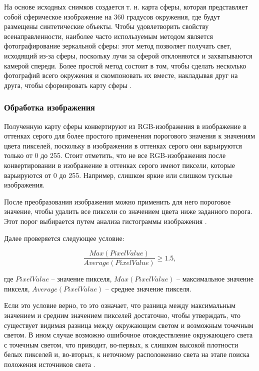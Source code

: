 На основе исходных снимков создается т. н. карта сферы, которая представляет собой сферическое изображение на 360 градусов окружения, где будут размещены синтетические объекты. Чтобы удовлетворить свойству всенаправленности, наиболее часто используемым методом является фотографирование зеркальной сферы: этот метод позволяет получать свет, исходящий из-за сферы, поскольку лучи за сферой отклоняются и захватываются камерой спереди. Более простой метод состоит в том, чтобы сделать несколько фотографий всего окружения и скомпоновать их вместе, накладывая друг на друга, чтобы сформировать карту сферы \cite{osti2019real}.

\subsubsection*{Обработка изображения}

Полученную карту сферы конвертируют из RGB-изображения в изображение в оттенках серого для более простого применения порогового значения к
значениям цвета пикселей, поскольку в изображении в оттенках серого они варьируются только от 0 до 255. Стоит отметить, что не все RGB-изображения после конвертировании в изображение в оттенках серого имеют пиксели, которые варьируются от 0 до 255. Например, слишком яркие или слишком тусклые изображения.

После преобразования изображения можно применить для него пороговое значение, чтобы удалить все пиксели со значением цвета ниже заданного порога. Этот порог выбирается путем анализа гистограммы изображения \cite{img_hists}.

Далее проверяется следующее условие:

\begin{equation}
	\frac{Max(PixelValue)}{Average(PixelValue)} \geq 1.5,
\end{equation}

где $PixelValue$ -- значение пикселя, $Max(PixelValue)$ -- максимальное значение пикселя, $Average(PixelValue)$ -- среднее значение пикселя.

Если это условие верно, то это означает, что разница между максимальным значением и средним значением пикселей достаточно, чтобы утверждать, что существует видимая разница между окружающим светом и возможным точечным светом. В ином случае возможно ошибочное отождествление окружающего света с точечным светом, что приводит, во-первых, к слишком высокой плотности белых пикселей и, во-вторых, к неточному расположению света на этапе поиска положения источников света \cite{osti2019real}.

